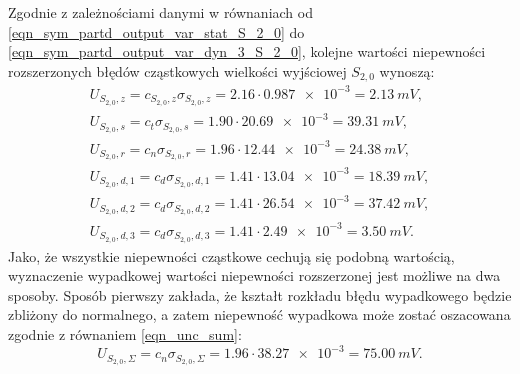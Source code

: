 Zgodnie z zależnościami danymi w równaniach od \eqref{eqn_sym_partd_output_var_stat_S_2_0} do \eqref{eqn_sym_partd_output_var_dyn_3_S_2_0}, kolejne wartości niepewności rozszerzonych błędów cząstkowych wielkości wyjściowej $S_{2,0}$ wynoszą:
\begin{gather}
U_{S_{2,0},z} = c_{S_{2,0},z} \sigma_{S_{2,0},z} = 2.16 \cdot \num{0.987e-3} = \qty{2.13}{mV} \label{eqn_sym_partd_output_unc_roun_S_2_0},\\
U_{S_{2,0},s} = c_{t} \sigma_{S_{2,0},s} = 1.90 \cdot \num{20.69e-3} = \qty{39.31}{mV} \label{eqn_sym_partd_output_unc_stat_S_2_0}, \\
U_{S_{2,0},r} = c_{n} \sigma_{S_{2,0},r} = 1.96 \cdot \num{12.44e-3} = \qty{24.38}{mV} \label{eqn_sym_partd_output_unc_rand_S_2_0}, \\
U_{S_{2,0},d,1} = c_{d} \sigma_{S_{2,0},d,1} = 1.41 \cdot \num{13.04e-3} = \qty{18.39}{mV} \label{eqn_sym_partd_output_unc_dyn_1_S_2_0}, \\
U_{S_{2,0},d,2} = c_{d} \sigma_{S_{2,0},d,2} = 1.41 \cdot \num{26.54e-3} = \qty{37.42}{mV} \label{eqn_sym_partd_output_unc_dyn_2_S_2_0}, \\
U_{S_{2,0},d,3} = c_{d} \sigma_{S_{2,0},d,3} = 1.41 \cdot \num{2.49e-3} = \qty{3.50}{mV} \label{eqn_sym_partd_output_unc_dyn_3_S_2_0}.
\end{gather}
Jako, że wszystkie niepewności cząstkowe cechują się podobną wartością, wyznaczenie wypadkowej wartości niepewności rozszerzonej jest możliwe na dwa sposoby. Sposób pierwszy zakłada, że kształt rozkładu błędu wypadkowego będzie zbliżony do normalnego, a zatem niepewność wypadkowa może zostać oszacowana zgodnie z równaniem \eqref{eqn_unc_sum}:
\begin{equation} 
U_{S_{2,0},\Sigma} = c_{n} \sigma_{S_{2,0},\Sigma} = 1.96 \cdot \num{38.27e-3} = \qty{75.00}{mV} \label{eqn_sym_partd_output_unc_total_a_S_2_0}.
\end{equation}

